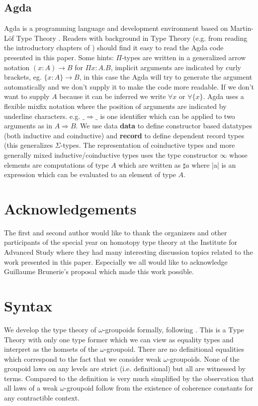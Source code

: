 \documentclass{acm_proc_article-sp}
\begin{document}
\subsection*{Agda}

Agda is a programming language and development environment based on
Martin-Löf Type Theory \cite{agda-wiki}. Readers with background in
Type Theory (e.g. from reading the introductory chapters of
\cite{hott}) should find it easy to read the Agda code presented
in this paper. Some hints: $\Pi$-types are written in a generalized
arrow notation $(x : A) → B$ for $\Pi x:A.B$, implicit arguments are
indicated by curly brackets, eg. $\{x : A\} → B$, in this case the Agda
will try to generate the argument automatically and we don't supply it
to make the code more readable. If we don't want to supply $A$ because
it can be inferred we write $\forall x$ or $\forall\{x\}$.
Agda uses a flexible mixfix notation
where the position of arguments are indicated by underline characters.
e.g. $\_⇒\_$ is one identifier which can be applied to two arguments as
in $A ⇒ B$.  
We use data \textbf{data} to define constructor based datatypes (both
inductive and coinductive) and \textbf{record} to define dependent record
types (this generalizes $\Sigma$-types. The representation of
coinductive types and more generally mixed inductive/coinductive types
\cite{txa:mpc2010g}
uses the type constructor $\infty$ whose elements are computations of type
$A$ which are written as $\sharp a$ where |a| is an expression which can be
evaluated to an element of type $A$.

\section*{Acknowledgements}

The first and second author would like to thank the organizers and
other participants of the special year on homotopy type theory at the
Institute for Advanced Study where they had many interesting
discussion topics related to the work presented in this
paper. Especially we all would like to acknowledge Guillaume
Brunerie's proposal which made this work possible. 




\section{Syntax}\label{sec:syntax}

We develop the type theory of $\omega$-groupoids formally, following
\cite{gb:wog}. This is a Type Theory with only one type former which
we can view as equality types and interpret as the homsets of the
$\omega$-groupoid. There are no definitional equalities which
correspond to the fact that we consider weak $\omega$-groupoids. None of the groupoid laws on any levels are strict (i.e. definitional) but all are witnessed by
terms. Compared to \cite{txa:csl} the definition is very much
simplified by the observation that all laws of a weak $\omega$-groupoid follow from the existence of coherence constants for
any contractible context.
\end{document}
